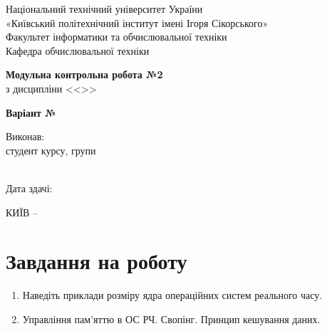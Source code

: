 \documentclass[14pt, a4paper]{extreport}
\begin{document}
	
	\begin{titlepage}
		\begin{center}
			\normalsize
			Національний технічний університет України\\
			«Київський політехнічний інститут імені Ігоря Сікорського» \\[0.5em]
			Факультет інформатики та обчислювальної техніки\\
			Кафедра обчислювальної техніки
			
			\vfill
			
			{\large \textbf{Модульна контрольна робота №2}\\[0.5em]}
			{з дисципліни <<\CourseTitle>>}
			
			\vspace{2em}
			
			\vspace{1em}
			
			{\textbf{Варіант №\Variant}}
			
			\vfill
			
			\begin{flushright}
				Виконав: \\ студент \CourseNumber{} курсу, групи \StudentGroup \\
				\StudentName \\[1em]
			\end{flushright}
			
			\vfill
			
			\begin{flushright}
				Дата здачі: \DTMtoday
			\end{flushright}
			
			\vspace{5em}
			КИЇВ -- \ReportYear
		\end{center}
	\end{titlepage}
	
	\clearpage
	\setcounter{page}{2}
	
	\section*{Завдання на роботу} 
	
	\begin{enumerate}
		\item Наведіть приклади розміру ядра операційних систем реального часу.
		
		\item Управління пам'яттю в ОС РЧ. Свопінг. Принцип кешування даних.
	\end{enumerate}
	
\end{document}
